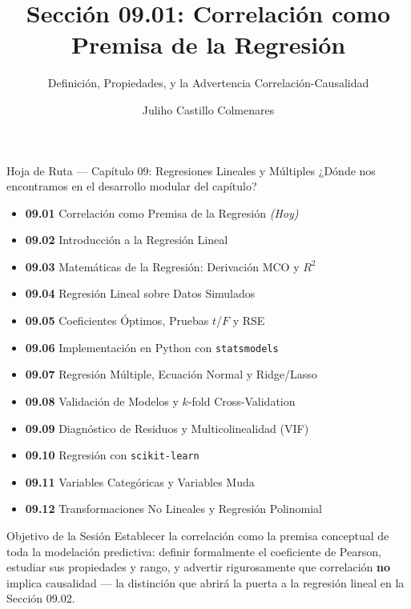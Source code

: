 \documentclass[10pt, aspectratio=169]{beamer}
\title[Correlación]{Sección 09.01: Correlación como Premisa de la Regresión}
\subtitle{Definición, Propiedades, y la Advertencia Correlación-Causalidad}
\author[J. Castillo Colmenares]{Juliho Castillo Colmenares}
\institute{Tecnológico de Monterrey}
\date{\vspace{-1.2cm}}
\begin{document}
\begin{frame}[plain]
  \vspace{-0.8cm}
  \titlepage
\end{frame}

\begin{frame}{Hoja de Ruta --- Capítulo 09: Regresiones Lineales y Múltiples}
  \scriptsize
  ¿Dónde nos encontramos en el desarrollo modular del capítulo?
  \begin{itemize}\itemsep=0.02em
    \item \textbf{09.01} Correlación como Premisa de la Regresión \emph{(Hoy)}
    \item \textbf{09.02} Introducción a la Regresión Lineal
    \item \textbf{09.03} Matemáticas de la Regresión: Derivación MCO y $R^2$
    \item \textbf{09.04} Regresión Lineal sobre Datos Simulados
    \item \textbf{09.05} Coeficientes Óptimos, Pruebas $t$/$F$ y RSE
    \item \textbf{09.06} Implementación en Python con \texttt{statsmodels}
    \item \textbf{09.07} Regresión Múltiple, Ecuación Normal y Ridge/Lasso
    \item \textbf{09.08} Validación de Modelos y $k$-fold Cross-Validation
    \item \textbf{09.09} Diagnóstico de Residuos y Multicolinealidad (VIF)
    \item \textbf{09.10} Regresión con \texttt{scikit-learn}
    \item \textbf{09.11} Variables Categóricas y Variables Muda
    \item \textbf{09.12} Transformaciones No Lineales y Regresión Polinomial
  \end{itemize}
  \pause
  \vspace{-0.05cm}
  \begin{block}{Objetivo de la Sesión}
    Establecer la correlación como la premisa conceptual de toda la modelación predictiva: definir formalmente el coeficiente de Pearson, estudiar sus propiedades y rango, y advertir rigurosamente que correlación \textbf{no} implica causalidad --- la distinción que abrirá la puerta a la regresión lineal en la Sección 09.02.
  \end{block}
\end{frame}
\end{document}
